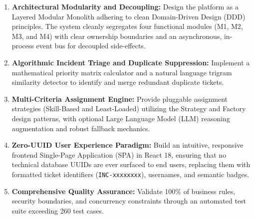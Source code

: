 \documentclass[11pt,a4paper,oneside]{report}
\begin{document}
\begin{enumerate}
    \item \textbf{Architectural Modularity and Decoupling:} Design the platform as a Layered Modular Monolith adhering to clean Domain-Driven Design (DDD) principles. The system cleanly segregates four functional modules (M1, M2, M3, and M4) with clear ownership boundaries and an asynchronous, in-process event bus for decoupled side-effects.
    \item \textbf{Algorithmic Incident Triage and Duplicate Suppression:} Implement a mathematical priority matrix calculator and a natural language trigram similarity detector to identify and merge redundant duplicate tickets.
    \item \textbf{Multi-Criteria Assignment Engine:} Provide pluggable assignment strategies (Skill-Based and Least-Loaded) utilizing the Strategy and Factory design patterns, with optional Large Language Model (LLM) reasoning augmentation and robust fallback mechanics.
    \item \textbf{Zero-UUID User Experience Paradigm:} Build an intuitive, responsive frontend Single-Page Application (SPA) in React 18, ensuring that no technical database UUIDs are ever surfaced to end users, replacing them with formatted ticket identifiers (\texttt{INC-xxxxxxxx}), usernames, and semantic badges.
    \item \textbf{Comprehensive Quality Assurance:} Validate 100\% of business rules, security boundaries, and concurrency constraints through an automated test suite exceeding 260 test cases.
\end{enumerate}
\end{document}
